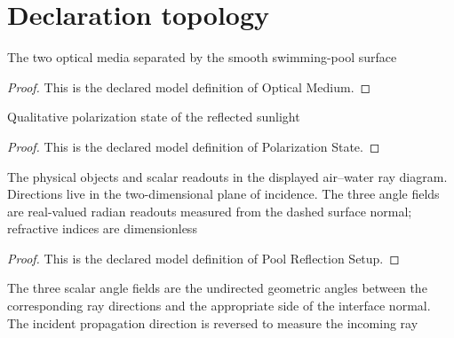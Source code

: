 \section{Declaration topology}
\begin{definition}
  \label{def:physics:phyx-mini-0037:phyxminiproblems-problemphyxmini0037-opticalmedium}
  The two optical media separated by the smooth swimming-pool surface
\end{definition}
\begin{proof}
  This is the declared model definition of Optical Medium.
\end{proof}
\begin{definition}
  \label{def:physics:phyx-mini-0037:phyxminiproblems-problemphyxmini0037-polarizationstate}
  Qualitative polarization state of the reflected sunlight
\end{definition}
\begin{proof}
  This is the declared model definition of Polarization State.
\end{proof}
\begin{definition}
  \label{def:physics:phyx-mini-0037:phyxminiproblems-problemphyxmini0037-poolreflectionsetup}
  The physical objects and scalar readouts in the displayed air--water ray diagram. Directions live in the two-dimensional plane of incidence. The three angle fields are real-valued radian readouts measured from the dashed surface normal; refractive indices are dimensionless
\end{definition}
\begin{proof}
  This is the declared model definition of Pool Reflection Setup.
\end{proof}
\begin{definition}
  \label{def:physics:phyx-mini-0037:phyxminiproblems-problemphyxmini0037-hasnormalanglereadouts}
  The three scalar angle fields are the undirected geometric angles between the corresponding ray directions and the appropriate side of the interface normal. The incident propagation direction is reversed to measure the incoming ray
\end{definition}
